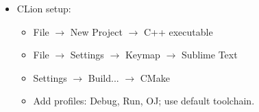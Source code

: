 \begin{itemize}
  \itemsep -.3em
  \item CLion setup:
  \begin{itemize}
    \itemsep -.3em
    \item File $\rightarrow$ New Project $\rightarrow$ C++ executable
    \item File $\rightarrow$ Settings $\rightarrow$ Keymap $\rightarrow$ Sublime Text
    \item Settings $\rightarrow$ Build... $\rightarrow$ CMake
    \item Add profiles: Debug, Run, OJ; use default toolchain.
  \end{itemize}
\end{itemize}